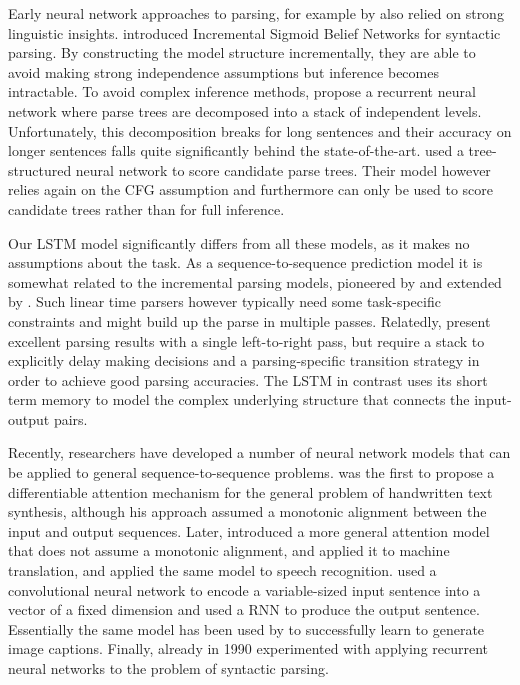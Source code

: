 \documentclass{article} \usepackage{nips15submit_e,times}
\newcommand\citet\cite
\begin{document}
Early neural network approaches to parsing, for example by
\cite{henderson:2003:NAACL,henderson:2004:ACL} also relied on strong linguistic insights.
\cite{titov-henderson:2007:ACL} introduced Incremental Sigmoid Belief Networks for syntactic parsing.
By constructing the model structure incrementally, they are able to avoid 
making strong independence assumptions but inference becomes intractable.
To avoid complex inference methods, 
\cite{collobert2011deep} propose a recurrent neural network
where parse trees are decomposed into a stack of independent levels.
Unfortunately, this decomposition breaks for long sentences and
their accuracy on longer sentences falls quite significantly behind
the state-of-the-art.
\cite{socher2011parsing} used a tree-structured neural network to score candidate parse trees.
Their model however relies again on the CFG assumption and
furthermore can only be used to score candidate trees rather than for full inference.

Our LSTM model significantly differs from all these models, as it makes no assumptions about
the task. As a sequence-to-sequence prediction model it is somewhat
related to the incremental parsing models, pioneered by \cite{ratnaparkhi}
and extended by \cite{collins-roark:2004:ACL}.
Such linear time parsers however typically need some task-specific constraints
and might build up the parse in multiple passes. Relatedly, \citet{zhu-EtAl:2013:ACL}
present excellent parsing results with a single left-to-right pass, but require a stack
to explicitly delay making decisions and a parsing-specific transition strategy in order
to achieve good parsing accuracies.
The LSTM in contrast uses its short term memory to model the complex underlying structure
that connects the input-output pairs.

Recently, researchers have developed a number of neural network models that
can be applied to general sequence-to-sequence problems.
\cite{graves2013generating} was the first to propose a differentiable attention
mechanism for the general problem of handwritten text synthesis, although his
approach assumed a monotonic alignment between the input and output sequences.
Later, \cite{bahdanau2014neural}
introduced a more general attention model that does not assume a monotonic
alignment, and applied it to machine translation, and
\cite{chorowski2014end} applied the same model to speech
recognition.  \cite{kalchbrenner2013recurrent} used a convolutional
neural network to encode a variable-sized input sentence into
a vector of a fixed dimension and used a RNN to produce the output sentence.
Essentially the same model has been used by \cite{vinyals2014show} to
successfully learn to generate image captions.
Finally, already in 1990 \cite{zoubin} experimented with
applying recurrent neural networks to the problem of syntactic parsing.
 \vspace{-0mm}
\end{document}
